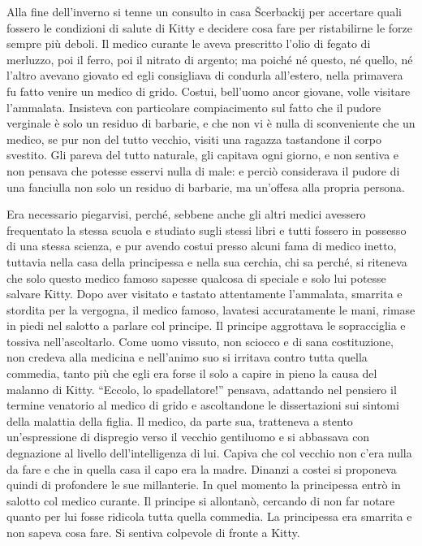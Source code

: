 \label{parte-seconda} 
\pagestyle{pagina}

Alla fine dell'inverno si tenne un consulto in casa Šcerbackij per accertare quali fossero le condizioni di salute di Kitty e decidere cosa fare per ristabilirne le forze sempre più deboli. Il medico curante le aveva prescritto l'olio di fegato di merluzzo, poi il ferro, poi il nitrato di argento; ma poiché né questo, né quello, né l'altro avevano giovato ed egli consigliava di condurla all'estero, nella primavera fu fatto venire un medico di grido. Costui, bell'uomo ancor giovane, volle visitare l'ammalata. Insisteva con particolare compiacimento sul fatto che il pudore verginale è solo un residuo di barbarie, e che non vi è nulla di sconveniente che un medico, se pur non del tutto vecchio, visiti una ragazza tastandone il corpo svestito. Gli pareva del tutto naturale, gli capitava ogni giorno, e non sentiva e non pensava che potesse esservi nulla di male: e perciò considerava il pudore di una fanciulla non solo un residuo di barbarie, ma un'offesa alla propria persona. 

Era necessario piegarvisi, perché, sebbene anche gli altri medici avessero frequentato la stessa scuola e studiato sugli stessi libri e tutti fossero in possesso di una stessa scienza, e pur avendo costui presso alcuni fama di medico inetto, tuttavia nella casa della principessa e nella sua cerchia, chi sa perché, si riteneva che solo questo medico famoso sapesse qualcosa di speciale e solo lui potesse salvare Kitty. Dopo aver visitato e tastato attentamente l'ammalata, smarrita e stordita per la vergogna, il medico famoso, lavatesi accuratamente le mani, rimase in piedi nel salotto a parlare col principe. Il principe aggrottava le sopracciglia e tossiva nell'ascoltarlo. Come uomo vissuto, non sciocco e di sana costituzione, non credeva alla medicina e nell'animo suo si irritava contro tutta quella commedia, tanto più che egli era forse il solo a capire in pieno la causa del malanno di Kitty. ``Eccolo, lo spadellatore!'' pensava, adattando nel pensiero il termine venatorio al medico di grido e ascoltandone le dissertazioni sui sintomi della malattia della figlia. Il medico, da parte sua, tratteneva a stento un'espressione di dispregio verso il vecchio gentiluomo e si abbassava con degnazione al livello dell'intelligenza di lui. Capiva che col vecchio non c'era nulla da fare e che in quella casa il capo era la madre. Dinanzi a costei si proponeva quindi di profondere le sue millanterie. In quel momento la principessa entrò in salotto col medico curante. Il principe si allontanò, cercando di non far notare quanto per lui fosse ridicola tutta quella commedia. La principessa era smarrita e non sapeva cosa fare. Si sentiva colpevole di fronte a Kitty. 

